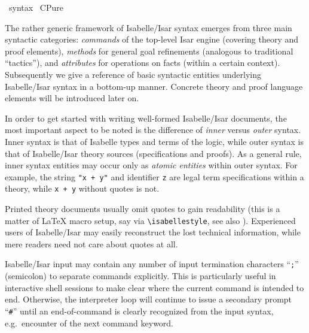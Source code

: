 %
\begin{isabellebody}%
\def\isabellecontext{syntax}%
%
\isadelimtheory
\isanewline
%
\endisadelimtheory
%
\isatagtheory
{}\isamarkupfalse%
\ {\isachardoublequoteopen}syntax{\isachardoublequoteclose}\isanewline
{}\ CPure\isanewline
{}%
\endisatagtheory
{\isafoldtheory}%
%
\isadelimtheory
%
\endisadelimtheory
%
\isamarkuptrue%
%
\begin{isamarkuptext}%
The rather generic framework of Isabelle/Isar syntax emerges from
  three main syntactic categories: \emph{commands} of the top-level
  Isar engine (covering theory and proof elements), \emph{methods} for
  general goal refinements (analogous to traditional ``tactics''), and
  \emph{attributes} for operations on facts (within a certain
  context).  Subsequently we give a reference of basic syntactic
  entities underlying Isabelle/Isar syntax in a bottom-up manner.
  Concrete theory and proof language elements will be introduced later
  on.

  \medskip In order to get started with writing well-formed
  Isabelle/Isar documents, the most important aspect to be noted is
  the difference of \emph{inner} versus \emph{outer} syntax.  Inner
  syntax is that of Isabelle types and terms of the logic, while outer
  syntax is that of Isabelle/Isar theory sources (specifications and
  proofs).  As a general rule, inner syntax entities may occur only as
  \emph{atomic entities} within outer syntax.  For example, the string
  \verb|"x + y"| and identifier \verb|z| are legal term
  specifications within a theory, while \verb|x + y| without
  quotes is not.

  Printed theory documents usually omit quotes to gain readability
  (this is a matter of {\LaTeX} macro setup, say via \verb|\isabellestyle|, see also \cite{isabelle-sys}).  Experienced
  users of Isabelle/Isar may easily reconstruct the lost technical
  information, while mere readers need not care about quotes at all.

  \medskip Isabelle/Isar input may contain any number of input
  termination characters ``\verb|;|'' (semicolon) to separate
  commands explicitly.  This is particularly useful in interactive
  shell sessions to make clear where the current command is intended
  to end.  Otherwise, the interpreter loop will continue to issue a
  secondary prompt ``\verb|#|'' until an end-of-command is
  clearly recognized from the input syntax, e.g.\ encounter of the
  next command keyword.


\end{isamarkuptext}
\end{isabellebody}
